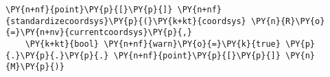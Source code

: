 \begin{Verbatim}[commandchars=\\\{\}]
    \PY{n+nf}{point}\PY{p}{[}\PY{p}{]} \PY{n+nf}{standardizecoordsys}\PY{p}{(}\PY{k+kt}{coordsys} \PY{n}{R}\PY{o}{=}\PY{n+nv}{currentcoordsys}\PY{p}{,}
    \PY{k+kt}{bool} \PY{n+nf}{warn}\PY{o}{=}\PY{k}{true} \PY{p}{.}\PY{p}{.}\PY{p}{.} \PY{n+nf}{point}\PY{p}{[}\PY{p}{]} \PY{n}{M}\PY{p}{)}
\end{Verbatim}
